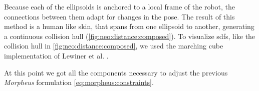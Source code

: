 Because each of the ellipsoids is anchored to a local frame of the robot, the connections between them adapt for changes in the pose.
The result of this method is a human like skin, that spans from one ellipsoid to another, generating a continuous collision hull (\cref{fig:neo:distance:composed}).
To visualize \acrshort{sdf}s, like the collision hull in \cref{fig:neo:distance:composed}, we used the marching cube implementation of Lewiner et al. \cite{lewiner_2003}.
\par
At this point we got all the components necessary to adjust the previous \textit{Morpheus} formulation \cref{eq:morpheus:constraints}.

